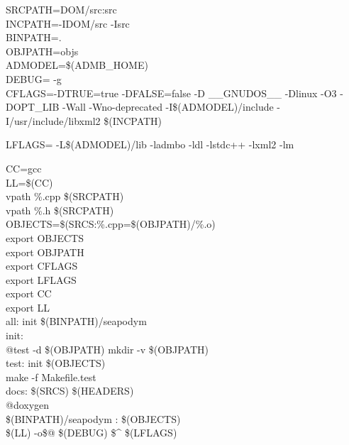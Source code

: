 \noindent SRCPATH=DOM/src:src \\
INCPATH=-IDOM/src -Isrc \\
BINPATH=. \\


\noindent OBJPATH=objs \\
ADMODEL=\$(ADMB\_HOME) \\

\noindent DEBUG= -g \\
CFLAGS=-DTRUE=true -DFALSE=false -D \_\_GNUDOS\_\_ -Dlinux -O3 -DOPT\_LIB -Wall -Wno-deprecated -I\$(ADMODEL)/include -I/usr/include/libxml2 \$(INCPATH)

LFLAGS= -L\$(ADMODEL)/lib  -ladmbo  -ldl -lstdc++ -lxml2 -lm

CC=gcc \\
LL=\$(CC) \\


\noindent vpath \%.cpp \$(SRCPATH) \\
vpath \%.h \$(SRCPATH) \\

\noindent OBJECTS=\$(SRCS:\%.cpp=\$(OBJPATH)/\%.o) \\


\noindent export OBJECTS \\
export OBJPATH \\

\noindent export CFLAGS \\
export LFLAGS \\
export CC \\
export LL \\


\noindent all: init \$(BINPATH)/seapodym \\


\noindent init: \\
        \indent @test -d \$(OBJPATH) \textbar\textbar \hspace{0.1cm} mkdir -v \$(OBJPATH) \\

\noindent test: init \$(OBJECTS) \\
        \indent make -f Makefile.test \\

\noindent docs: \$(SRCS) \$(HEADERS) \\
        \indent @doxygen \\

\noindent \$(BINPATH)/seapodym : \$(OBJECTS) \\
        \indent \$(LL) -o\$@ \$(DEBUG) \$\textbf{\^}  \$(LFLAGS) \\


